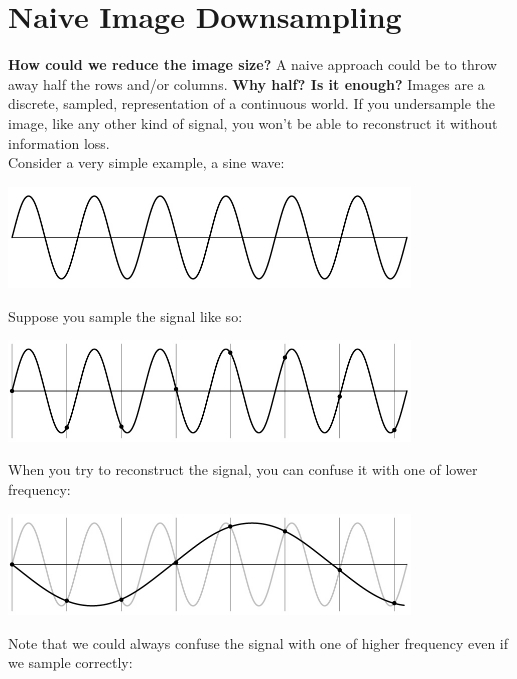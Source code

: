 \documentclass{article}
\begin{document}
\newpage

\section*{Naive Image Downsampling}

\textbf{How could we reduce the image size?} A naive approach could be to throw away half the rows and/or columns. \textbf{Why half? Is it enough?} Images are a discrete, sampled, representation of a continuous world. If you undersample the image, like any other kind of signal, you won't be able to reconstruct it without information loss. \\

Consider a very simple example, a sine wave:

\begin{center}
\includegraphics[width=0.8\textwidth]{images/signal_2.png}
\end{center}

Suppose you sample the signal like so:

\begin{center}
\includegraphics[width=0.8\textwidth]{images/undersampling.png}
\end{center}

When you try to reconstruct the signal, you can confuse it with one of lower frequency:

\begin{center}
\includegraphics[width=0.8\textwidth]{images/undersampling_lower_freq.png}
\end{center}

Note that we could always confuse the signal with one of higher frequency even if we sample correctly:
\end{document}
